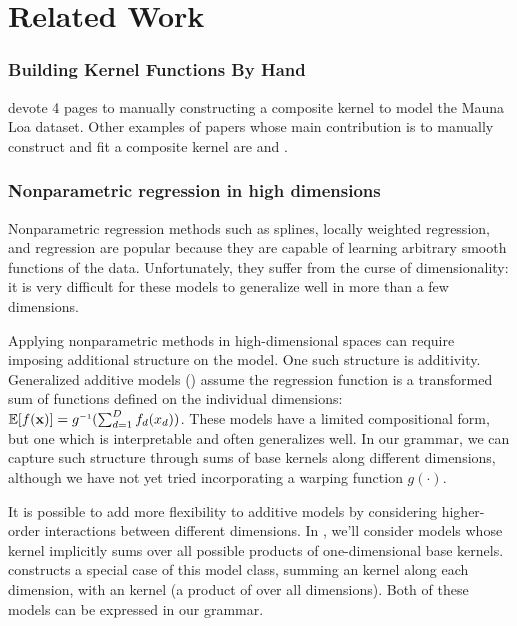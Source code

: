 




\section{Related Work}
\label{sec:gpss-related-work}

\def\rwsheader{\subsubsection}

\rwsheader{Building Kernel Functions By Hand}
\cite{rasmussen38gaussian} devote 4 pages to manually constructing a composite kernel to model the Mauna Loa dataset.
Other examples of papers whose main contribution is to manually construct and fit a composite \gp{} kernel are \cite{EdgarTelescope} and \cite{lloydgefcom2012}.


\rwsheader{Nonparametric regression in high dimensions}
Nonparametric regression methods such as splines, locally weighted regression, and \gp{} regression are popular because they are capable of learning arbitrary smooth functions of the data.
Unfortunately, they suffer from the curse of dimensionality: it is very difficult for these models to generalize well in more than a few dimensions.

Applying nonparametric methods in high-dimensional spaces can require imposing additional structure on the model.
One such structure is additivity.
Generalized additive models (\GAM{}) assume the regression function is a transformed sum of functions defined on the individual dimensions: $\expect[f(\vx)] = g\inv(\sum_{d=1}^D f_d(x_d))$.
These models have a limited compositional form, but one which is interpretable and often generalizes well.
In our grammar, we can capture such structure through sums of base kernels along different dimensions, although we have not yet tried incorporating a warping function $g(\cdot)$.

It is possible to add more flexibility to additive models by considering higher-order interactions between different dimensions. 
In , we'll consider \gp{} models whose kernel implicitly sums over all possible products of one-dimensional base kernels.
\citet{plate1999accuracy} constructs a special case of this model class, summing an \kSE{} kernel along each dimension, with an \seard{} kernel (a product of \kSE{} over all dimensions).
Both of these models can be expressed in our grammar.

